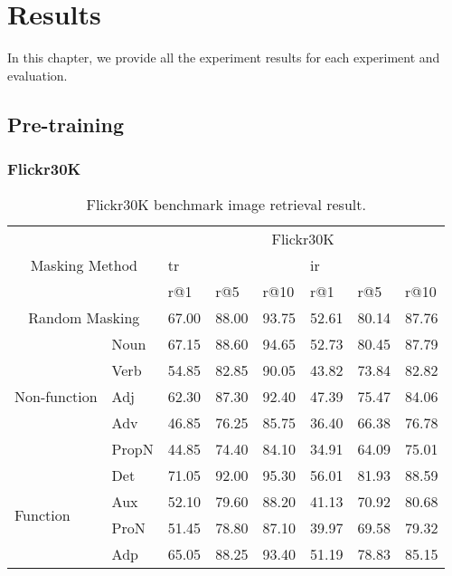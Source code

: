 \chapter{Results}
In this chapter, we provide all the experiment results for each experiment and evaluation.

\section{Pre-training}

\subsection{Flickr30K}

\begin{table}[]
    \centering
    \label{tab:flickr30k}
    \caption{Flickr30K benchmark image retrieval result.}
    \begin{tabular}{ll|lll|lll}
        \multicolumn{2}{c|}{\multirow{3}{*}{Masking Method}} & \multicolumn{6}{c}{Flickr30K} \\
        \multicolumn{2}{l|}{} & \multicolumn{3}{l|}{\acrshort{tr}} & \multicolumn{3}{l}{\acrshort{ir}} \\
        \multicolumn{2}{l|}{} & r@1 & r@5 & r@10 & r@1 & r@5 & r@10 \\
        \hline
        \multicolumn{2}{c|}{Random Masking} & \cellcolor{yellow}67.00 & 88.00 & 93.75 & 52.61 & 80.14 & 87.76 \\
        \hline
        \multirow{5}{*}{Non-function} & Noun & 67.15 & 88.60 & 94.65 & 52.73 & 80.45 & 87.79 \\
        & Verb & 54.85 & 82.85 & 90.05 & 43.82 & 73.84 & 82.82 \\
        & Adj & 62.30 & 87.30 & 92.40 & 47.39 & 75.47 & 84.06 \\
        & Adv & 46.85 & 76.25 & 85.75 & 36.40 & 66.38 & 76.78 \\
        & PropN & 44.85 & 74.40 & 84.10 & 34.91 & 64.09 & 75.01 \\
        \hline
        \multirow{4}{*}{Function} & Det & 71.05 & 92.00 & 95.30 & 56.01 & 81.93 & 88.59 \\
        & Aux  & 52.10 & 79.60 & 88.20 & 41.13 & 70.92 & 80.68 \\
        & ProN & 51.45 & 78.80 & 87.10 & 39.97 & 69.58 & 79.32 \\
        & Adp & 65.05 & 88.25 & 93.40 & 51.19 & 78.83 & 85.15 \\
    \end{tabular}
\end{table}

